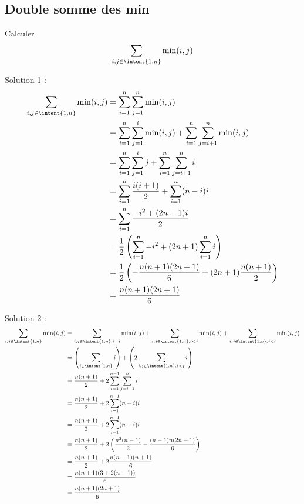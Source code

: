\subsection{Double somme des min}

\begin{exercice}
Calculer 
$$\sum_{i,j \in \intent{1,n}} \min(i,j)$$
\end{exercice}


\begin{correction}
\underline{Solution 1 :} 
\begin{align*}
\sum_{i,j \in \intent{1,n}} \min(i,j) &= \sum_{i=1}^n \sum_{j=1}^n\min(i,j)\\
												&= \sum_{i=1}^n \sum_{j=1}^i\min(i,j) + \sum_{i=1}^n \sum_{j=i+1}^n\min(i,j)\\
												&= \sum_{i=1}^n \sum_{j=1}^i j  + \sum_{i=1}^n \sum_{j=i+1}^n i\\
													&= \sum_{i=1}^n \frac{i(i+1)}{2}+ \sum_{i=1}^n (n-i) i\\
													&= \sum_{i=1}^n \frac{-i^2+(2n+1)i}{2}\\		
													&= \frac{1}{2} \left( \sum_{i=1}^n -i^2  + (2n+1)\sum_{i=1}^ni \right)\\																					&= \frac{1}{2} \left(-\frac{n(n+1)(2n+1)}{6} +(2n+1)\frac{n(n+1)}{2}\right)\\											
													&=\frac{n(n+1)(2n+1)}{6} 
\end{align*}



\underline{Solution 2 :}
\begin{align*}
\sum_{i,j \in \intent{1,n}} \min(i,j)  &= \sum_{i,j \in \intent{1,n}, i=j} \min(i,j)  +\sum_{i,j \in \intent{1,n}, i<j } \min(i,j)  + \sum_{i,j \in \intent{1,n}, j<i } \min(i,j) \\
										&=\left( \sum_{i \in \intent{1,n} } i \right) +\left(2\sum_{i,j \in \intent{1,n}, i< j } i \right)\\
										&= \frac{n(n+1)}{2} + 2 \sum_{i=1}^{n-1}\sum_{j=i+1}^n i \\
										&= \frac{n(n+1)}{2} + 2 \sum_{i=1}^{n-1}(n-i) i \\
										&= \frac{n(n+1)}{2} + 2 \sum_{i=1}^{n-1}(n-i) i \\
										&= \frac{n(n+1)}{2} + 2 \left( \frac{n^2(n-1)}{2}  - \frac{(n-1)n(2n-1)}{6}     \right)  \\
											&= \frac{n(n+1)}{2} + 2 \frac{n(n-1)(n+1)}{6} \\
											&= \frac{n(n+1) (3 +2(n-1))}{6} \\
											&= \frac{n(n+1) (2n+1)}{6} 
\end{align*}


\end{correction}